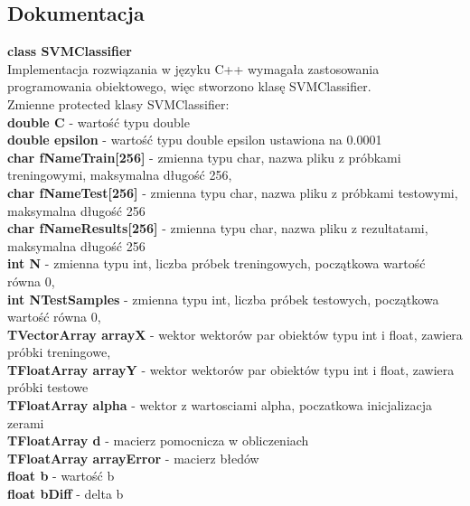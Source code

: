 \documentclass[11pt]{article}
\begin{document}
\begin{enumerate}
\subsection{Dokumentacja}

\textbf{class SVMClassifier}\\ Implementacja rozwiązania w języku C++ wymagała zastosowania programowania obiektowego, więc stworzono klasę SVMClassifier. \\

Zmienne protected klasy SVMClassifier:\\
\textbf{double C} - wartość typu double\\
\textbf{double epsilon} - wartość typu double epsilon ustawiona na 0.0001\\
\textbf{char fNameTrain[256]} - zmienna typu char, nazwa pliku z próbkami treningowymi, maksymalna długość 256,\\
\textbf{char fNameTest[256]} -  zmienna typu char, nazwa pliku z próbkami testowymi, maksymalna długość 256\\
\textbf{char fNameResults[256]} -  zmienna typu char, nazwa pliku z rezultatami, maksymalna długość 256\\  
\textbf{int N }- zmienna typu int, liczba próbek treningowych, początkowa wartość równa 0,\\
\textbf{int NTestSamples} - zmienna typu int, liczba próbek testowych, początkowa wartość równa 0,\\
\textbf{TVectorArray arrayX} - wektor wektorów par obiektów typu int i float, zawiera próbki treningowe,\\
\textbf{TFloatArray arrayY }- wektor wektorów par obiektów typu int i float, zawiera próbki testowe\\
\textbf{TFloatArray alpha} - wektor z wartosciami alpha, poczatkowa inicjalizacja zerami\\
\textbf{TFloatArray d }- macierz pomocnicza w obliczeniach\\
\textbf{TFloatArray arrayError }- macierz błedów \\
\textbf{float b }- wartość b\\
\textbf{float bDiff }- delta b\\


\end{enumerate}
\end{document}
